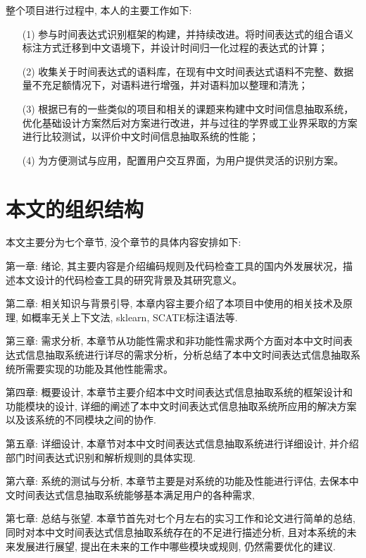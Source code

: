 整个项目进行过程中, 本人的主要工作如下:
\begin{enumerate}
    \item[(1)] 参与时间表达式识别框架的构建，并持续改进。将时间表达式的组合语义标注方式迁移到中文语境下，并设计时间归一化过程的表达式的计算；
    \item[(2)] 收集关于时间表达式的语料库，在现有中文时间表达式语料不完整、数据量不充足额情况下，对语料进行增强，并对语料加以整理和清洗；
    \item[(3)] 根据已有的一些类似的项目和相关的课题来构建中文时间信息抽取系统，优化基础设计方案然后对方案进行改进，并与过往的学界或工业界采取的方案进行比较测试，以评价中文时间信息抽取系统的性能；
    \item[(4)] 为方便测试与应用，配置用户交互界面，为用户提供灵活的识别方案。
\end{enumerate}


\section{本文的组织结构}

本文主要分为七个章节, 没个章节的具体内容安排如下:

第一章: 绪论, 其主要内容是介绍编码规则及代码检查工具的国内外发展状况，描述本文设计的代码检查工具的研究背景及其研究意义。

第二章: 相关知识与背景引导, 本章内容主要介绍了本项目中使用的相关技术及原理, 如概率无关上下文法, sklearn, SCATE标注语法等.

第三章: 需求分析, 本章节从功能性需求和非功能性需求两个方面对本中文时间表达式信息抽取系统进行详尽的需求分析，分析总结了本中文时间表达式信息抽取系统所需要实现的功能及其他性能需求。

第四章: 概要设计, 本章节主要介绍本中文时间表达式信息抽取系统的框架设计和功能模块的设计, 详细的阐述了本中文时间表达式信息抽取系统所应用的解决方案以及该系统的不同模块之间的协作.

第五章: 详细设计, 本章节对本中文时间表达式信息抽取系统进行详细设计, 并介绍部门时间表达式识别和解析规则的具体实现.

第六章: 系统的测试与分析, 本章节主要是对系统的功能及性能进行评估, 去保本中文时间表达式信息抽取系统能够基本满足用户的各种需求,

第七章: 总结与张望. 本章节首先对七个月左右的实习工作和论文进行简单的总结, 同时对本中文时间表达式信息抽取系统存在的不足进行描述分析, 且对本系统的未来发展进行展望, 提出在未来的工作中哪些模块或规则, 仍然需要优化的建议.



